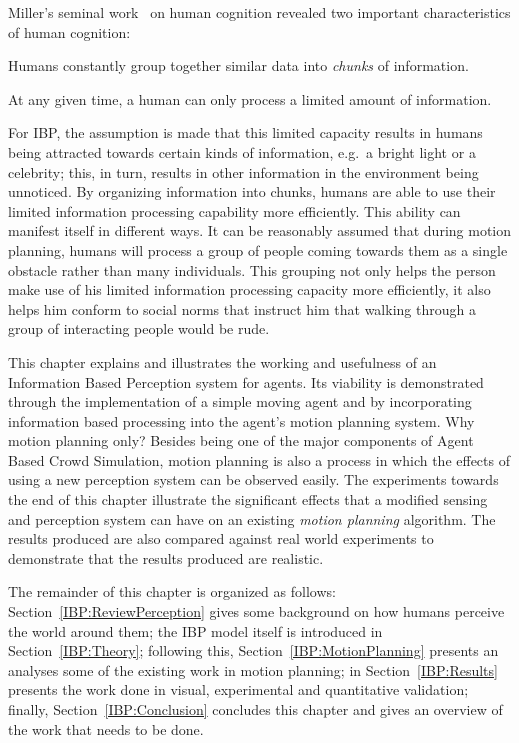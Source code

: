 Miller's seminal work~\cite{Miller:1956tr} on human cognition revealed two important characteristics of human cognition:
\begin{inparaenum}
\item Humans constantly group together similar data into \emph{chunks} of information.
\item At any given time, a human can only process a limited amount of information.
\end{inparaenum}
For IBP, the assumption is made that this limited capacity results in humans being attracted towards certain kinds of information, e.g.\ a bright light or a celebrity; this, in turn, results in other information in the environment being unnoticed. By organizing information into chunks, humans are able to use their limited information processing capability more efficiently. This ability can manifest itself in different ways. It can be reasonably assumed that during motion planning, humans will process a group of people coming towards them as a single obstacle rather than many individuals. This grouping not only helps the person make use of his limited information processing capacity more efficiently,  it also helps him conform to social norms that instruct him that walking through a group of interacting people would be rude.


This chapter explains and illustrates the working and usefulness of an Information Based Perception system for agents. Its viability is demonstrated through the implementation of a simple moving agent and by incorporating information based processing into the agent's motion planning system. Why motion planning only? Besides being one of the major components of Agent Based Crowd Simulation, motion planning is also a process in which the effects of using a new perception system can be observed easily. The experiments towards the end of this chapter illustrate the significant effects that a modified sensing and perception system can have on an existing \emph{motion planning} algorithm. The results produced are also compared against real world experiments to demonstrate that the results produced are realistic.

The remainder of this chapter is organized as follows: Section~\ref{IBP:ReviewPerception} gives some background on how humans perceive the world around them; the IBP model itself is introduced in Section~\ref{IBP:Theory}; following this, Section~\ref{IBP:MotionPlanning} presents an analyses some of the existing work in motion planning; in Section~\ref{IBP:Results} presents the work done in visual, experimental and quantitative validation; finally, Section~\ref{IBP:Conclusion} concludes this chapter and gives an overview of the work that needs to be done.

